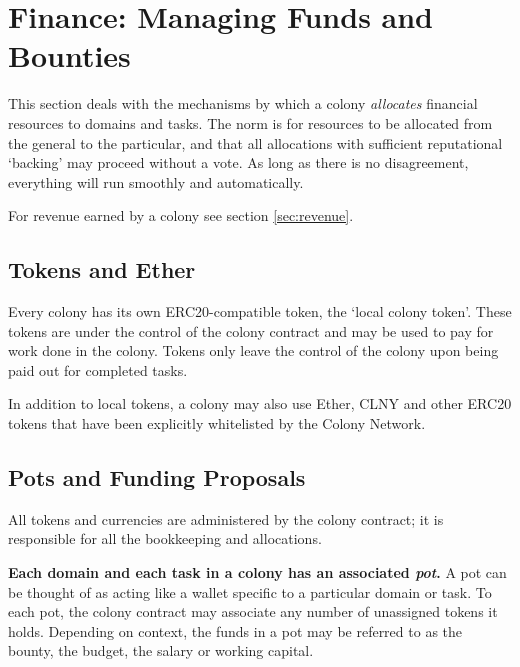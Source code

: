 

\section{Finance: Managing Funds and Bounties}\label{sec:finance}
This section deals with the mechanisms by which a colony \emph{allocates} financial resources to domains and tasks. The norm is for resources to be allocated from the general to the particular, and that all allocations with sufficient reputational `backing' may proceed without a vote. As long as there is no disagreement, everything will run smoothly and automatically.

For revenue earned by a colony see section \ref{sec:revenue}.

\subsection{Tokens and Ether}
Every colony has its own ERC20-compatible token, the `local colony token'. These tokens are under the control of the colony contract and may be used to pay for work done in the colony. Tokens only leave the control of the colony upon being paid out for completed tasks.

In addition to local tokens, a colony may also use Ether, CLNY and other ERC20 tokens that have been explicitly whitelisted by the Colony Network.


\subsection{Pots and Funding Proposals}\label{sec:pots-and-fp}
All tokens and currencies are administered by the colony contract; it is responsible for all the bookkeeping and allocations.

\textbf{Each domain and each task in a colony has an associated \emph{pot}.} A pot can be thought of as acting like a wallet specific to a particular domain or task. To each pot, the colony contract may associate any number of unassigned tokens it holds. Depending on context, the funds in a pot may be referred to as the bounty, the budget, the salary or working capital.


